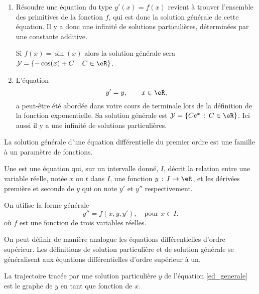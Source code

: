 \begin{example}
	\begin{enumerate}
		\item
		      Résoudre une équation du type \( y'(x)=f(x)\) revient à trouver l'ensemble des primitives de la fonction \(f\), qui est donc la solution générale de cette équation. Il y a donc une infinité de solutions particulières, déterminées par une constante additive.

		      Si \(f (x) = \sin(x)\) alors la solution générale sera \(\mathcal{Y} = \{-\cos(x) + C\, : \, C\in\eR\}\).
		\item
		      L'équation
		      \begin{equation}\label{equation_exponentielle}
			      y'= y, \qquad x \in\eR,
		      \end{equation}
		      a peut-être été abordée dans votre cours de terminale lors de la définition de la fonction exponentielle. Sa solution générale est \(\mathcal{Y} = \{Ce^x\, : \, C\in\eR\}\). Ici aussi il y a une infinité de solutions particulières.
	\end{enumerate}
\end{example}
\begin{remark}
	La solution générale d'une équation différentielle du premier ordre est une famille à un paramètre de fonctions.
\end{remark}
\begin{definition}
	Une   est une équation qui, sur un intervalle donné, \(I\), décrit la relation entre une variable réelle, notée \(x\) ou \(t\) dans \(I\), une fonction \(y \,:\,I\to\eR \), et les dérivées première et seconde de \(y\) qui on note \(y'\) et \(y''\) respectivement.

	On utilise la forme générale
	\begin{equation}\label{ed_generale_second_ordre}
		y'' = f(x,y, y'),\quad\text{pour }x\in I.
	\end{equation}
	o\`u \(f\) est une fonction de trois variables réelles.
\end{definition}
On peut définir de manière analogue les équations différentielles d'ordre supérieur. Les définitions de solution particulière et de solution générale se généralisent aux équations différentielles d'ordre supérieur à un.
\vspace{0.5cm}
\begin{definition}[Trajectoire]
	La trajectoire tracée par une solution particulière \( y\) de l'équation \eqref{ed_generale} est le graphe de \( y\) en tant que fonction de \( x\).
\end{definition}
